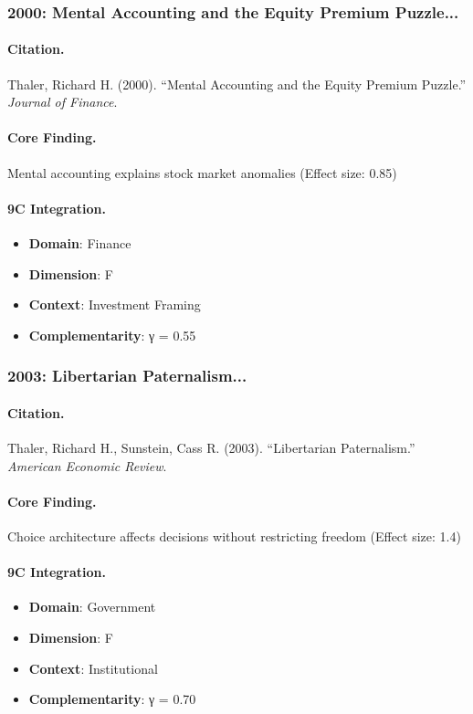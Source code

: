 \subsubsection{2000: Mental Accounting and the Equity Premium Puzzle...}

\paragraph{Citation.}
Thaler, Richard H. (2000). ``Mental Accounting and the Equity Premium Puzzle.''
\textit{Journal of Finance}.

\paragraph{Core Finding.}
Mental accounting explains stock market anomalies (Effect size: 0.85)

\paragraph{9C Integration.}
\begin{itemize}[nosep]
  \item \textbf{Domain}: Finance
  \item \textbf{Dimension}: F
  \item \textbf{Context}: Investment Framing
  \item \textbf{Complementarity}: γ = 0.55
\end{itemize}

\subsubsection{2003: Libertarian Paternalism...}

\paragraph{Citation.}
Thaler, Richard H., Sunstein, Cass R. (2003). ``Libertarian Paternalism.''
\textit{American Economic Review}.

\paragraph{Core Finding.}
Choice architecture affects decisions without restricting freedom (Effect size: 1.4)

\paragraph{9C Integration.}
\begin{itemize}[nosep]
  \item \textbf{Domain}: Government
  \item \textbf{Dimension}: F
  \item \textbf{Context}: Institutional
  \item \textbf{Complementarity}: γ = 0.70
\end{itemize}

